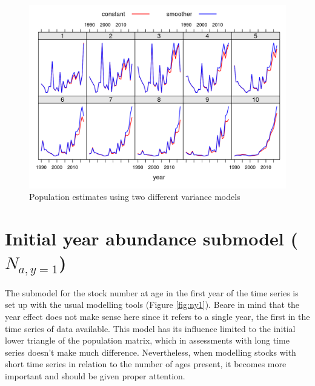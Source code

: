 \documentclass[
]{book}
\begin{document}
\begin{figure}
\centering
\includegraphics{_bookdown_files/_main_files/figure-html/vmodimpact-1.png}
\caption{\label{fig:vmodimpact}Population estimates using two different variance models}
\end{figure}

\hypertarget{initial-year-abundance-submodel-n_ay1}{%
\section{\texorpdfstring{Initial year abundance submodel (\(N_{a,y=1}\))}{Initial year abundance submodel (N\_\{a,y=1\})}}\label{initial-year-abundance-submodel-n_ay1}}

The submodel for the stock number at age in the first year of the time series is set up with the usual modelling tools (Figure \ref{fig:ny1}). Beare in mind that the year effect does not make sense here since it refers to a single year, the first in the time series of data available. This model has its influence limited to the initial lower triangle of the population matrix, which in assessments with long time series doesn't make much difference. Nevertheless, when modelling stocks with short time series in relation to the number of ages present, it becomes more important and should be given proper attention.
\end{document}
